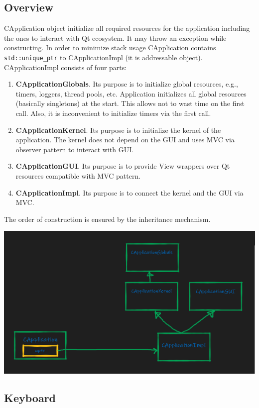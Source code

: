 \documentclass{article}
\begin{document}
\subsection{Overview}

CApplication object initialize all required resources for the application including the ones to interact with Qt ecosystem. It may throw an exception while constructing. In order to minimize stack usage CApplication contains \verb"std::unique_ptr" to CApplicationImpl (it is addressable object). CApplicationImpl consists of four parts:
\begin{enumerate}
\item \textbf{CApplicationGlobals}. Its purpose is to initialize global resources, e.g., timers, loggers, thread pools, etc. Application initializes all global resources (basically singletons) at the start. This allows not to wast time on the first call. Also, it is inconvenient to initialize timers via the first call.
\item \textbf{CApplicationKernel}. Its purpose is to initialize the kernel of the application. The kernel does not depend on the GUI and uses MVC via observer pattern to interact with GUI.
\item \textbf{CApplicationGUI}. Its purpose is to provide View wrappers over Qt resources compatible with MVC pattern.
\item \textbf{CApplicationImpl}. Its purpose is to connect the kernel and the GUI via MVC.
\end{enumerate}
The order of construction is ensured by the inheritance mechanism.
\begin{center}
\includegraphics[scale = 0.3]{Figures/CApplicationStructure.png}
\end{center}

\subsection{Keyboard}
\end{document}
